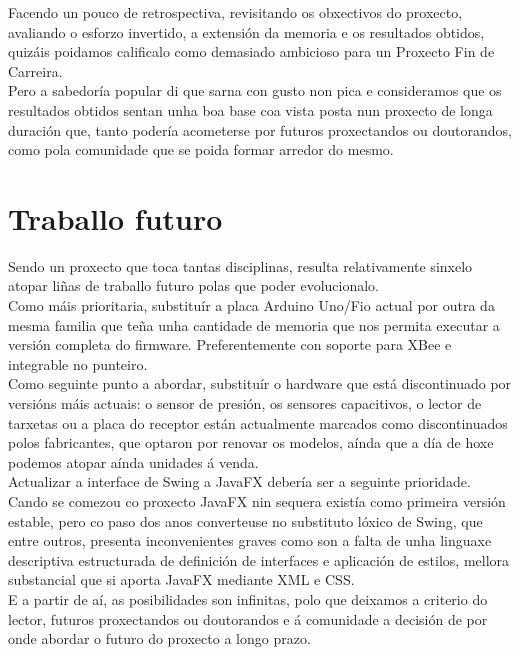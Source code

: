  Facendo un pouco de retrospectiva, revisitando os obxectivos do proxecto,
 avaliando o esforzo invertido, a extensión da memoria e os resultados obtidos,
 quizáis poidamos calificalo como demasiado ambicioso para un Proxecto Fin de
 Carreira. \\
 
 Pero a sabedoría popular di que sarna con gusto non pica e consideramos que os
 resultados obtidos sentan unha boa base coa vista posta nun proxecto de longa
 duración que, tanto podería acometerse por futuros proxectandos ou doutorandos,
 como pola comunidade que se poida formar arredor do mesmo. \\
 
 \section{Traballo futuro}
 
 
 Sendo un proxecto que toca tantas disciplinas, resulta relativamente sinxelo
 atopar liñas de traballo futuro polas que poder evolucionalo. \\
 
 Como máis prioritaria, substituír a placa Arduino Uno/Fio actual por outra da
 mesma familia que teña unha cantidade de memoria que nos permita executar a
 versión completa do firmware. Preferentemente con soporte para XBee e
 integrable no punteiro. \\
 
 Como seguinte punto a abordar, substituír o hardware que está discontinuado por
 versións máis actuais: o sensor de presión, os sensores capacitivos, o lector
 de tarxetas ou a placa do receptor están actualmente marcados como
 discontinuados polos fabricantes, que optaron por renovar os modelos, aínda que
 a día de hoxe podemos atopar aínda unidades á venda. \\
 
 Actualizar a interface de Swing a JavaFX debería ser a seguinte prioridade.
 Cando se comezou co proxecto JavaFX nin sequera existía como primeira versión
 estable, pero co paso dos anos converteuse no substituto lóxico de Swing, que
 entre outros, presenta inconvenientes graves como son a falta de unha linguaxe
 descriptiva estructurada de definición de interfaces e aplicación de estilos,
 mellora substancial que si aporta JavaFX mediante XML e CSS. \\
 
 E a partir de aí, as posibilidades son infinitas, polo que deixamos a criterio
 do lector, futuros proxectandos ou doutorandos e á comunidade a decisión de por
 onde abordar o futuro do proxecto a longo prazo. \\
 
 
